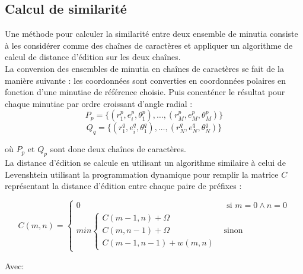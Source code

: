 \documentclass{report}
\begin{document}
\subsection{Calcul de similarité}

Une méthode pour calculer la similarité entre deux ensemble de
minutia consiste à les considérer comme des chaînes de caractères et
appliquer un algorithme de calcul de distance d'édition sur les deux
chaînes.\\

La conversion des ensembles de minutia en chaînes de caractères se
fait de la manière suivante : les coordonnées sont converties en
coordonnées polaires en fonction d'une minutiae de référence
choisie. Puis concaténer le résultat pour chaque minutiae par ordre
croissant d'angle radial :
$$P_p = \{(r_{1}^p, e_{i}^p, \theta_{1}^p), \ldots, (r_{M}^p, e_{M}^p, \theta_{M}^p)\}$$
$$Q_q = \{(r_{1}^q, e_{i}^q, \theta_{1}^q), \ldots, (r_{N}^q, e_{N}^q, \theta_{N}^q)\}$$

où $P_p$ et $Q_p$ sont donc deux chaînes de caractères.\\

La distance d'édition se calcule en utilisant un algorithme similaire
à celui de Levenshtein utilisant la programmation dynamique pour
remplir la matrice $C$ représentant la distance d'édition entre chaque
paire de préfixes :

$$C(m,n) = \left \{
\begin{array}{ll}
  0 & \mbox{ si } m = 0 \land n = 0\\
  min \left \{
      \begin{array}{l}
        C(m - 1, n) + \Omega\\
        C(m, n - 1) + \Omega\\
        C(m - 1, n - 1) + w(m, n)
      \end{array}  \right . & \mbox {sinon }
\end{array} \right .
$$

Avec:
\end{document}
